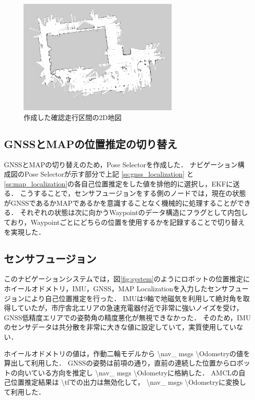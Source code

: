 \documentclass[platex,dvipdfmx]{rbproceedings}
\begin{document}
\begin{figure}[htbp]
    \centering   
    \includegraphics[keepaspectratio,width=80mm]{fig/map.png}
    \caption{作成した確認走行区間の2D地図}
    \label{fig:map}
\end{figure}

\subsection{GNSSとMAPの位置推定の切り替え}
GNSSとMAPの切り替えのため，Pose Selectorを作成した．
ナビゲーション構成図のPose Selectorが示す部分で上記 \ref{ss:gnss_localization} と  \ref{ss:map_localization}の各自己位置推定をした値を排他的に選択し，EKFに送る．
こうすることで，センサフュージョンをする側のノードでは，現在の状態がGNSSであるかMAPであるかを意識することなく機械的に処理することができる．
それぞれの状態は次に向かうWaypointのデータ構造にフラグとして内包しており，Waypointごとにどちらの位置を使用するかを記録することで切り替えを実現した．


\subsection{センサフュージョン}\label{ss:sensor_fusion}
このナビゲーションシステムでは，図\ref{fig:system}のようにロボットの位置推定にホイールオドメトリ，IMU，GNSS，MAP Localizationを入力したセンサフュージョンにより自己位置推定を行った．
IMUは9軸で地磁気を利用して絶対角を取得していたが，市庁舎北エリアの急速充電器付近で非常に強いノイズを受け，GNSS低精度エリアでの姿勢角の精度悪化が無視できなかった．
そのため，IMUのセンサデータは共分散を非常に大きな値に設定していて，実質使用していない．

ホイールオドメトリの値は，作動二輪モデルから  \textbackslash nav\_ msgs \textbackslash Odometryの値を算出して利用した．
GNSSの姿勢は前項の通り，直前の連続した位置からロボットの向いている方向を推定し  \textbackslash nav\_ msgs \textbackslash Odometryに格納した．
AMCLの自己位置推定結果は \textbackslash tfでの出力は無効化して，  \textbackslash nav\_ msgs \textbackslash Odometryに変換して利用した．
\end{document}
